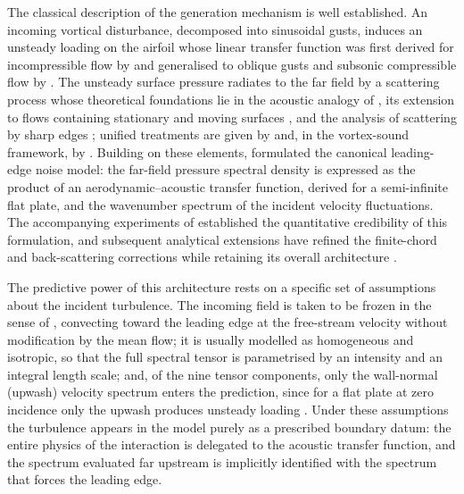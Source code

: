 \documentclass[lineno]{JFM-FLM_Au}
\begin{document}
The classical description of the generation mechanism is well established.
An incoming vortical disturbance, decomposed into sinusoidal gusts, induces
an unsteady loading on the airfoil whose linear transfer function was first
derived for incompressible flow by \citet{Sears1941} and generalised to
oblique gusts and subsonic compressible flow by \citet{Graham1970}. The
unsteady surface pressure radiates to the far field by a scattering process
whose theoretical foundations lie in the acoustic analogy of
\citet{Lighthill1952}, its extension to flows containing stationary and
moving surfaces \citep{Curle1955,FfowcsWilliamsHawkings1969}, and the
analysis of scattering by sharp edges \citep{FfowcsWilliamsHall1970}; unified
treatments are given by \citet{Goldstein1976} and, in the vortex-sound
framework, by \citet{Howe2003}. Building on these elements,
\citet{Amiet1975} formulated the canonical leading-edge noise model: the
far-field pressure spectral density is expressed as the product of an
aerodynamic--acoustic transfer function, derived for a semi-infinite flat
plate, and the wavenumber spectrum of the incident velocity fluctuations.
The accompanying experiments of \citet{PatersonAmiet1976} established the
quantitative credibility of this formulation, and subsequent analytical
extensions have refined the finite-chord and back-scattering corrections
while retaining its overall architecture
\citep{RogerMoreau2005,MoreauRoger2009}.

The predictive power of this architecture rests on a specific set of
assumptions about the incident turbulence. The incoming field is taken to be
frozen in the sense of \citet{Taylor1938}, convecting toward the leading edge
at the free-stream velocity without modification by the mean flow; it is
usually modelled as homogeneous and isotropic, so that the full spectral
tensor is parametrised by an intensity and an integral length scale; and, of
the nine tensor components, only the wall-normal (upwash) velocity spectrum
enters the prediction, since for a flat plate at zero incidence only the
upwash produces unsteady loading \citep{Amiet1975,Goldstein1976}. Under
these assumptions the turbulence appears in the model purely as a prescribed
boundary datum: the entire physics of the interaction is delegated to the
acoustic transfer function, and the spectrum evaluated far upstream is
implicitly identified with the spectrum that forces the leading edge.
\end{document}
